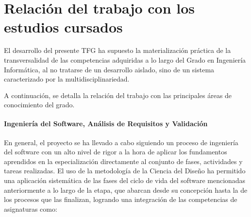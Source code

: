 \section{Relación del trabajo con los estudios cursados}

El desarrollo del presente TFG ha supuesto la materialización práctica de la transversalidad de las competencias adquiridas a lo largo del Grado en Ingeniería Informática, al no tratarse de un desarrollo aislado, sino de un sistema caracterizado por la multidisciplinariedad.

A continuación, se detalla la relación del trabajo con las principales áreas de conocimiento del grado.

\paragraph{Ingeniería del Software, Análisis de Requisitos y Validación}

En general, el proyecto se ha llevado a cabo siguiendo un proceso de ingeniería del software con un alto nivel de rigor a la hora de aplicar los fundamentos aprendidos en la especialización directamente al conjunto de fases, actividades y tareas realizadas. El uso de la metodología de la Ciencia del Diseño ha permitido una aplicación sistemática de las fases del ciclo de vida del software mencionadas anteriormente a lo largo de la etapa, que abarcan desde su concepción hasta la de los procesos que las finalizan, logrando una integración de las competencias de asignaturas como:

